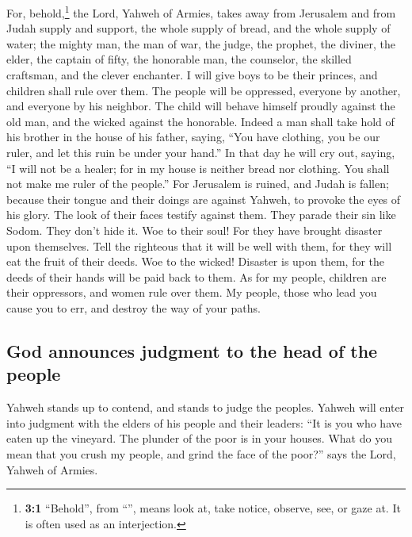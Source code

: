  For, behold,\footnote{\textbf{3:1} ``Behold'', from
  ``'', means look at, take notice, observe, see, or gaze
  at. It is often used as an interjection.} the Lord, Yahweh of Armies,
takes away from Jerusalem and from Judah supply and support, the whole
supply of bread, and the whole supply of water;  the
mighty man, the man of war, the judge, the prophet, the diviner, the
elder,  the captain of fifty, the honorable man, the
counselor, the skilled craftsman, and the clever enchanter.
 I will give boys to be their princes, and children shall
rule over them.  The people will be oppressed, everyone by
another, and everyone by his neighbor. The child will behave himself
proudly against the old man, and the wicked against the honorable.
 Indeed a man shall take hold of his brother in the house
of his father, saying, ``You have clothing, you be our ruler, and let
this ruin be under your hand.''  In that day he will cry
out, saying, ``I will not be a healer; for in my house is neither bread
nor clothing. You shall not make me ruler of the people.''
 For Jerusalem is ruined, and Judah is fallen; because
their tongue and their doings are against Yahweh, to provoke the eyes of
his glory.  The look of their faces testify against them.
They parade their sin like Sodom. They don't hide it. Woe to their soul!
For they have brought disaster upon themselves.  Tell the
righteous that it will be well with them, for they will eat the fruit of
their deeds.  Woe to the wicked! Disaster is upon them,
for the deeds of their hands will be paid back to them. 
As for my people, children are their oppressors, and women rule over
them. My people, those who lead you cause you to err, and destroy the
way of your paths.

\hypertarget{god-announces-judgment-to-the-head-of-the-people}{%
\subsection{God announces judgment to the head of the
people}\label{god-announces-judgment-to-the-head-of-the-people}}

 Yahweh stands up to contend, and stands to judge the
peoples.  Yahweh will enter into judgment with the elders
of his people and their leaders: ``It is you who have eaten up the
vineyard. The plunder of the poor is in your houses. 
What do you mean that you crush my people, and grind the face of the
poor?'' says the Lord, Yahweh of Armies.

